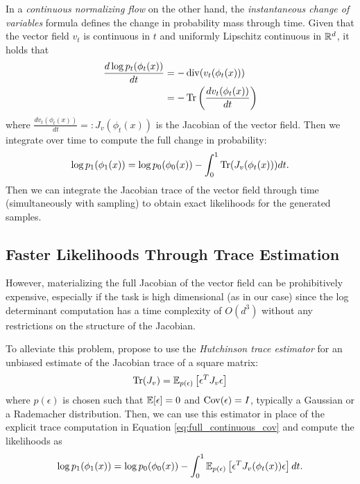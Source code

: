 In a \textit{continuous normalizing flow} on the other hand, the \textit{instantaneous change of variables} formula \citep{chenNeuralOrdinaryDifferential2018a} defines the change in probability mass through time. Given that the vector field $v_t$ is continuous in $t$ and uniformly Lipschitz continuous in $\mathbb{R}^d$, it holds that
\begin{align} \label{eq:continuous_cov}
    \frac{d \log p_t(\phi_t(x))}{dt} &= - \operatorname{div}(v_t(\phi_t(x))) \\
                                     &= - \operatorname{Tr} \left( \frac{d v_t(\phi_t(x))}{dt} \right)
\end{align}
where $\frac{d v_t(\phi_t(x))}{dt} =: J_v(\phi_t(x))$ is the Jacobian of the vector field. Then we integrate over time to compute the full change in probability:
\begin{equation} \label{eq:full_continuous_cov}
    \log p_1(\phi_1(x)) = \log p_0(\phi_0(x)) - \int_0^1 \operatorname{Tr}(J_v(\phi_t(x))) dt.
\end{equation}
Then we can integrate the Jacobian trace of the vector field through time (simultaneously with sampling) to obtain exact likelihoods for the generated samples. 

\subsection{Faster Likelihoods Through Trace Estimation} \label{section:trace_estimation}

However, materializing the full Jacobian of the vector field can be prohibitively expensive, especially if the task is high dimensional (as in our case) since the log determinant computation has a time complexity of $O(d^3)$ \citep{grathwohlFFJORDFreeformContinuous2018} without any restrictions on the structure of the Jacobian. 

To alleviate this problem, \citep{grathwohlFFJORDFreeformContinuous2018} propose to use the \textit{Hutchinson trace estimator} \citep{hutchinsonStochasticEstimatorTrace1990} for an unbiased estimate of the Jacobian trace of a square matrix: 
\begin{equation} \label{eq:hutchinson}
    \operatorname{Tr}(J_v) = \mathbb{E}_{p(\epsilon)} \left[ \epsilon^T J_v \epsilon \right]
\end{equation}
where $p(\epsilon)$ is chosen such that $\mathbb{E}[\epsilon] = 0$ and $\operatorname{Cov}(\epsilon) = I$, typically a Gaussian or a Rademacher distribution. Then, we can use this estimator in place of the explicit trace computation in Equation \ref{eq:full_continuous_cov} and compute the likelihoods as
\begin{equation}
    \log p_1(\phi_1(x)) = \log p_0(\phi_0(x)) - \int_0^1 \mathbb{E}_{p(\epsilon)} \left[ \epsilon^T J_v(\phi_t(x)) \epsilon \right] dt.
\end{equation}

